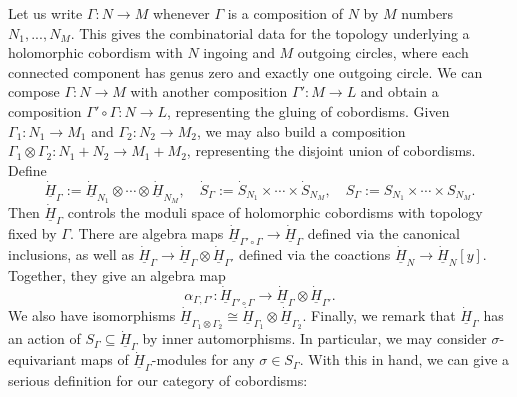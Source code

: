 \documentclass[11pt]{report}
\theoremstyle{definition}
\theoremstyle{remark}
\theoremstyle{remark}
\begin{document}
Let us write $\Gamma: N \to M$ whenever $\Gamma$ is a composition of $N$ by $M$ numbers $N_1,...,N_M$. This gives the combinatorial data for the topology underlying a holomorphic cobordism with $N$ ingoing and $M$ outgoing circles, where each connected component has genus zero and exactly one outgoing circle. We can compose $\Gamma: N \to M$ with another composition $\Gamma': M \to L$ and obtain a composition $\Gamma' \circ \Gamma: N \to L$, representing the gluing of cobordisms. Given $\Gamma_1: N_1 \to M_1$ and $\Gamma_2: N_2 \to M_2$, we may also build a composition $\Gamma_1 \otimes \Gamma_2: N_1+N_2 \to M_1+M_2$, representing the disjoint union of cobordisms. Define
\begin{equation*}
\underline{\dot H}_\Gamma := \underline{\dot H}_{N_1} \otimes \cdots \otimes \underline{\dot H}_{N_M}, \quad \dot S_\Gamma := \dot S_{N_1} \times \cdots \times \dot S_{N_M}, \quad S_\Gamma := S_{N_1} \times \cdots \times S_{N_M}.
\end{equation*}
Then $\underline{\dot H}_\Gamma$ controls the moduli space of holomorphic cobordisms with topology fixed by $\Gamma$. There are algebra maps $\underline{\dot H}_{\Gamma' \circ \Gamma} \to \underline{\dot H}_\Gamma$ defined via the canonical inclusions, as well as $\underline{\dot H}_\Gamma \to \underline{\dot H}_\Gamma \otimes \underline{\dot H}_{\Gamma'}$ defined via the coactions $\underline{\dot H}_N \to \underline{\dot H}_N[y]$. Together, they give an algebra map
\begin{equation*}
\alpha_{\Gamma,\Gamma'}: \underline{\dot H}_{\Gamma' \circ \Gamma} \to \underline{\dot H}_\Gamma \otimes \underline{\dot H}_{\Gamma'}.
\end{equation*}
We also have isomorphisms $\underline{\dot H}_{\Gamma_1 \otimes \Gamma_2} \cong \underline{\dot H}_{\Gamma_1} \otimes \underline{\dot H}_{\Gamma_2}$. Finally, we remark that $\underline{\dot H}_\Gamma$ has an action of $S_\Gamma \subseteq \underline{\dot H}_\Gamma$ by inner automorphisms. In particular, we may consider $\sigma$-equivariant maps of $\underline{\dot H}_\Gamma$-modules for any $\sigma \in S_\Gamma$. With this in hand, we can give a serious definition for our category of cobordisms:
\end{document}
